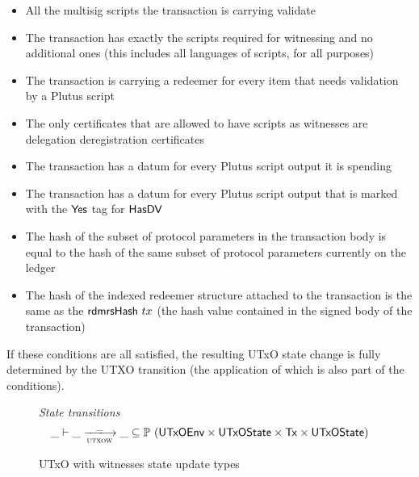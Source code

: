 \begin{itemize}

    \item All the multisig scripts the transaction is carrying validate

    \item The transaction has exactly the scripts required for witnessing and no
    additional ones (this includes all languages of scripts, for all purposes)

    \item The transaction is carrying a redeemer for every item that needs
    validation by a Plutus script

    \item The only certificates that are allowed to have scripts as witnesses
    are delegation deregistration certificates

    \item The transaction has a datum for every Plutus script output it is spending

    \item The transaction has a datum for every Plutus script output that is
    marked with the $\mathsf{Yes}$ tag for $\mathsf{HasDV}$

    \item
    The hash of the subset of protocol parameters in the transaction body is equal to
    the hash of the same subset of protocol parameters currently on the ledger

    \item The hash of the indexed redeemer structure attached to the transaction is
    the same as the $\mathsf{rdmrsHash}~{tx}$ (the hash value contained in the signed body of
    the transaction)

\end{itemize}

If these conditions are all satisfied, the resulting UTxO state change is fully determined
by the UTXO transition (the application of which is also part of the conditions).

\begin{figure}[htb]
  \emph{State transitions}
  \begin{equation*}
    \_ \vdash
    \var{\_} \trans{utxow}{\_} \var{\_}
    \subseteq \powerset (\UTxOEnv \times \UTxOState \times \Tx \times \UTxOState)
  \end{equation*}
  \caption{UTxO with witnesses state update types}
  \label{fig:ts-types:utxo-scripts}
\end{figure}

